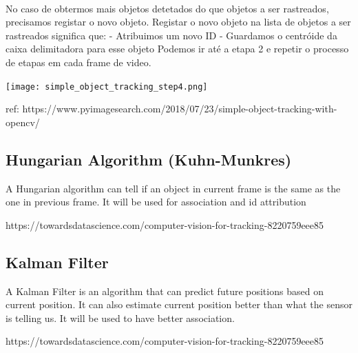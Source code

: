 \paragraph{}
No caso de obtermos mais objetos detetados do que objetos a ser rastreados, precisamos registar o novo objeto. Registar o novo objeto na lista de objetos a ser rastreados significa que: 
\newline - Atribuimos um novo ID
\newline - Guardamos o centróide da caixa delimitadora para esse objeto
\newline
Podemos ir até a etapa 2 e repetir o processo de etapas em cada frame de video.

\begin{center}
  \texttt{[image: simple\_object\_tracking\_step4.png]}
  \label{img:centroid_traking4}  
\end{center}



ref: 
https://www.pyimagesearch.com/2018/07/23/simple-object-tracking-with-opencv/


\subsection{Hungarian Algorithm (Kuhn-Munkres)}
\label{chap2:subsec:hungarian}

A Hungarian algorithm can tell if an object in current frame is the same as the one in previous frame. It will be used for association and id attribution

https://towardsdatascience.com/computer-vision-for-tracking-8220759eee85

\subsection{Kalman Filter}
\label{chap2:subsec:kalman}


A Kalman Filter is an algorithm that can predict future positions based on current position. It can also estimate current position better than what the sensor is telling us. It will be used to have better association.

https://towardsdatascience.com/computer-vision-for-tracking-8220759eee85




































